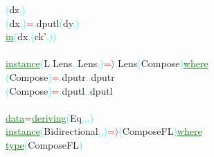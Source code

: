 \textcolor{cyan}{(}{\rm{}dz}\textcolor{cyan}{,}\textcolor{cyan}{)}\\\hstab \hstab \hsspace \hsspace \hsspace \hsspace \textcolor{cyan}{(}{\rm{}dx}\textcolor{cyan}{,}\textcolor{cyan}{)}\hsspace \textcolor{red}{=}\textcolor{cyan}{.}{\rm{}dputl}\hsspace \textcolor{cyan}{(}{\rm{}dy}\textcolor{cyan}{,}\textcolor{cyan}{)}\\\hstab \hstab \textcolor{green}{\underline{in}}\hsspace \textcolor{cyan}{(}{\rm{}dx}\textcolor{cyan}{,}\hsspace \textcolor{cyan}{(}{\rm{}ck'}\textcolor{cyan}{,}\textcolor{cyan}{)}\textcolor{cyan}{)}\\\\\textcolor{green}{\underline{instance}}\hsspace \textcolor{cyan}{(}{\rm{}L}\textcolor{cyan}{.}{\rm{}Lens}\textcolor{cyan}{,}\textcolor{cyan}{.}{\rm{}Lens}\textcolor{cyan}{,}\hsspace \textcolor{red}{\tilde{ }}\textcolor{cyan}{)}\hsspace \textcolor{red}{=\ensuremath{\rangle}}\textcolor{cyan}{.}{\rm{}Lens}\hsspace \textcolor{cyan}{(}{\rm{}Compose}\textcolor{cyan}{)}\hsspace \textcolor{green}{\underline{where}}\\\hsspace \textcolor{cyan}{(}{\rm{}Compose}\textcolor{cyan}{)}\hsspace \textcolor{red}{=}\textcolor{cyan}{.}{\rm{}dputr}\hsspace \textcolor{cyan}{.}\textcolor{cyan}{.}{\rm{}dputr}\\\hsspace \textcolor{cyan}{(}{\rm{}Compose}\textcolor{cyan}{)}\hsspace \textcolor{red}{=}\textcolor{cyan}{.}{\rm{}dputl}\hsspace \textcolor{cyan}{.}\textcolor{cyan}{.}{\rm{}dputl}\\\\\textcolor{green}{\underline{data}}\hsspace \textcolor{red}{=}\hsspace \textcolor{green}{\underline{deriving}}\hsspace \textcolor{cyan}{(}{\rm{}Eq}\textcolor{cyan}{,}\textcolor{cyan}{,}\textcolor{cyan}{,}\textcolor{cyan}{)}\\\textcolor{green}{\underline{instance}}\hsspace \textcolor{cyan}{(}{\rm{}Bidirectional}\textcolor{cyan}{,}\textcolor{cyan}{,}\hsspace \textcolor{red}{\tilde{ }}\textcolor{cyan}{)}\hsspace \textcolor{red}{=\ensuremath{\rangle}}\hsspace \textcolor{cyan}{(}{\rm{}ComposeFL}\textcolor{cyan}{)}\hsspace \textcolor{green}{\underline{where}}\\\hstab \textcolor{green}{\underline{type}}\hsspace \textcolor{cyan}{(}{\rm{}ComposeFL}\textcolor{cyan}{)}\hsspace 